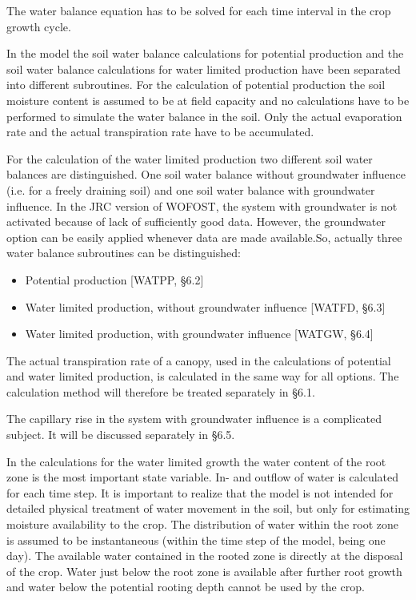 The water balance equation has to be solved for each time interval in the crop growth cycle.

In the model the soil water balance calculations for potential production and the soil water
balance calculations for water limited production have been separated into different
subroutines. For the calculation of potential production the soil moisture content is
assumed to be at field capacity and no calculations have to be performed to simulate the
water balance in the soil. Only the actual evaporation rate and the actual transpiration rate
have to be accumulated. 

For the calculation of the water limited production two different soil water balances are
distinguished. One soil water balance without groundwater influence (i.e. for a freely
draining soil) and one soil water balance with groundwater influence. In the JRC version
of WOFOST, the system with groundwater is not activated because of lack of sufficiently
good data. However, the groundwater option can be easily applied whenever data are
made available.So, actually three water balance subroutines can be distinguished:
\begin{itemize}
\item Potential production [WATPP, \S  6.2]\\
\item Water limited production, without groundwater influence [WATFD, \S  6.3]\\
\item Water limited production, with groundwater influence [WATGW, \S  6.4]
\end{itemize}
 
The actual transpiration rate of a canopy, used in the calculations of potential and water
limited production, is calculated in the same way for all options. The calculation method
will therefore be treated separately in \S 6.1. 

The capillary rise in the system with groundwater influence is a complicated subject. It
will be discussed separately in \S 6.5.

In the calculations for the water limited growth the water content of the root zone is the
most important state variable. In- and outflow of water is calculated for each time step. It
is important to realize that the model is not intended for detailed physical treatment of
water movement in the soil, but only for estimating moisture availability to the crop. The
distribution of water within the root zone is assumed to be instan\-taneous (within the time
step of the model, being one day). The available water contained in the rooted zone is
directly at the disposal of the crop. Water just below the root zone is available after
further root growth and water below the potential rooting depth cannot be used by the
crop.

